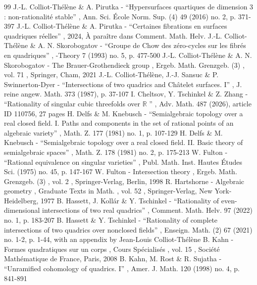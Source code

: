 \documentclass[11pt]{article}
\theoremstyle{definition}
\begin{document}
\begin{thebibliography}{99}
 J.-L. Colliot-Thélène \& A. Pirutka - “Hypersurfaces quartiques de dimension 3 : non-rationalité stable” , Ann. Sci. École Norm. Sup. (4) 49 (2016) no. 2, p. 371-397
 J.-L. Colliot-Thélène \& A. Pirutka - “Certaines fibrations en surfaces quadriques réelles” , 2024, À paraître dans Comment. Math. Helv.
 J.-L. Colliot-Thélène \& A. N. Skorobogatov - “Groupe de Chow des zéro-cycles sur les fibrés en quadriques” , -Theory 7 (1993) no. 5, p. 477-500
 J.-L. Colliot-Thélène \& A. N. Skorobogatov - The Brauer-Grothendieck group , Ergeb. Math. Grenzgeb. (3) , vol. 71 , Springer, Cham, 2021
 J.-L. Colliot-Thélène, J.-J. Sansuc \& P. Swinnerton-Dyer - “Intersections of two quadrics and Châtelet surfaces. I” , J. reine angew. Math. 373 (1987), p. 37-107
 I. Cheltsov, Y. Tschinkel \& Z. Zhang - “Rationality of singular cubic threefolds over $\mathbb{R}$ ” , Adv. Math. 487 (2026), article ID 110756, 27 pages
 H. Delfs \& M. Knebusch - “Semialgebraic topology over a real closed field. I. Paths and components in the set of rational points of an algebraic variety” , Math. Z. 177 (1981) no. 1, p. 107-129
 H. Delfs \& M. Knebusch - “Semialgebraic topology over a real closed field. II. Basic theory of semialgebraic spaces” , Math. Z. 178 (1981) no. 2, p. 175-213
 W. Fulton - “Rational equivalence on singular varieties” , Publ. Math. Inst. Hautes Études Sci. (1975) no. 45, p. 147-167
 W. Fulton - Intersection theory , Ergeb. Math. Grenzgeb. (3) , vol. 2 , Springer-Verlag, Berlin, 1998
 R. Hartshorne - Algebraic geometry , Graduate Texts in Math. , vol. 52 , Springer-Verlag, New York-Heidelberg, 1977
 B. Hassett, J. Kollár \& Y. Tschinkel - “Rationality of even-dimensional intersections of two real quadrics” , Comment. Math. Helv. 97 (2022) no. 1, p. 183-207
 B. Hassett \& Y. Tschinkel - “Rationality of complete intersections of two quadrics over nonclosed fields” , Enseign. Math. (2) 67 (2021) no. 1-2, p. 1-44, with an appendix by Jean-Louis Colliot-Thélène
 B. Kahn - Formes quadratiques sur un corps , Cours Spécialisés , vol. 15 , Société Mathématique de France, Paris, 2008
 B. Kahn, M. Rost \& R. Sujatha - “Unramified cohomology of quadrics. I” , Amer. J. Math. 120 (1998) no. 4, p. 841-891

\end{thebibliography}
\end{document}
